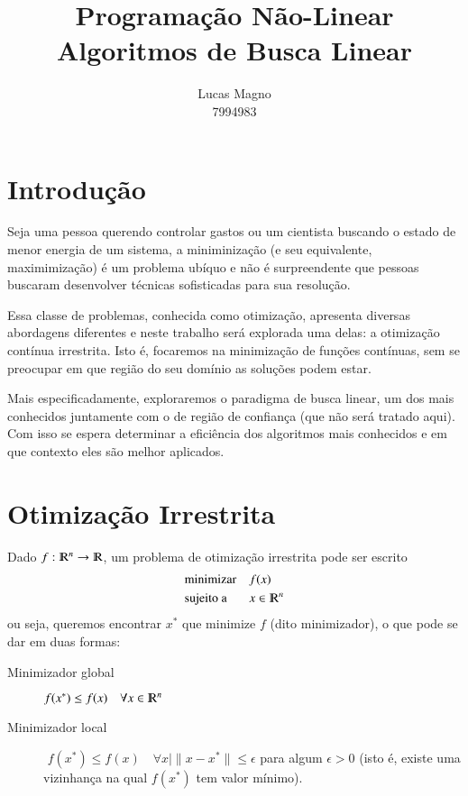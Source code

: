 \documentclass[a4paper,11pt]{article}
\date{}
\author{Lucas Magno \\ 7994983}
\title{Programação Não-Linear \\ Algoritmos de Busca Linear}
\begin{document}
    \maketitle

    \section*{Introdução}
        Seja uma pessoa querendo controlar gastos ou um cientista buscando o estado de menor energia de um sistema, a miniminização (e seu equivalente, maximimização) é um problema ubíquo e não é surpreendente que pessoas buscaram desenvolver técnicas sofisticadas para sua resolução.

        Essa classe de problemas, conhecida como otimização, apresenta diversas abordagens diferentes e neste trabalho será explorada uma delas: a otimização contínua irrestrita.
        Isto é, focaremos na minimização de funções contínuas, sem se preocupar em que região do seu domínio as soluções podem estar.

        Mais especificadamente, exploraremos o paradigma de busca linear, um dos mais conhecidos juntamente com o de região de confiança (que não será tratado aqui).
        Com isso se espera determinar a eficiência dos algoritmos mais conhecidos e em que contexto eles são melhor aplicados.

    \section*{Otimização Irrestrita}
        Dado $f: \varmathbb{R}^n \rightarrow \varmathbb{R}$, um problema de
        otimização irrestrita pode ser escrito
        \begin{equation*}
            \begin{aligned}
                & \text{minimizar} & & f(x) \\
                & \text{sujeito a} & & x \in \varmathbb{R}^n \\
            \end{aligned}
        \end{equation*}
        ou seja, queremos encontrar $x^*$ que minimize $f$ (dito minimizador), o que pode se dar em duas formas:
        \begin{description}
            \item [Minimizador global] $f(x^*) \leq f(x) \quad  \forall x \in \varmathbb{R}^n$
            \item [Minimizador local]  $\,\,f(x^*) \leq f(x) \quad  \forall x \mid \|x - x^*\| \leq \epsilon$
                    para algum $\epsilon > 0$ (isto é, existe uma vizinhança na qual $f(x^*)$ tem valor mínimo).
        \end{description}
\end{document}
